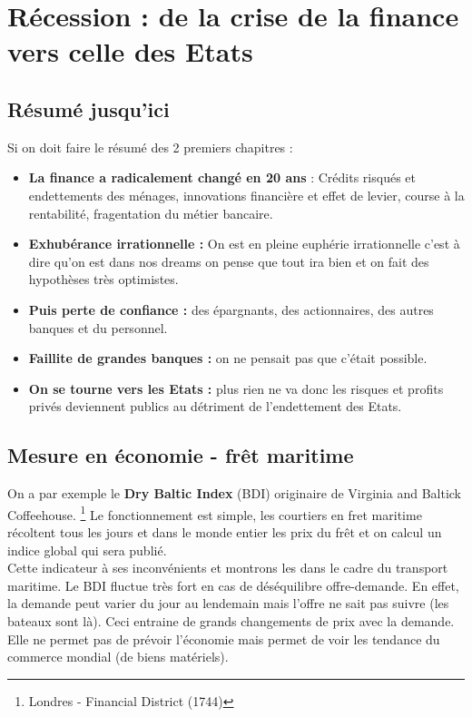 
\chapter{Récession : de la crise de la finance vers celle des Etats}
\section{Résumé jusqu'ici}
Si on doit faire le résumé des 2 premiers chapitres : 
\begin{itemize}
	\item \textbf{La finance a radicalement changé en 20 ans} : Crédits risqués et endettements des ménages, innovations financière et effet de levier, course à la rentabilité, fragentation du métier bancaire.
	      
	\item \textbf{Exhubérance irrationnelle :} On est en pleine euphérie irrationnelle c'est à dire qu'on est dans nos dreams on pense que tout ira bien et on fait des hypothèses très optimistes.
	      
	\item \textbf{Puis perte de confiance :} des épargnants, des actionnaires, des autres banques et du personnel. 
	      
	\item \textbf{Faillite de grandes banques :} on ne pensait pas que c'était possible. 
	      
	\item \textbf{On se tourne vers les Etats :} plus rien ne va donc les risques et profits privés deviennent publics au détriment de l'endettement des Etats.  
\end{itemize}

\section{Mesure en économie - frêt maritime}
On a par exemple le \textbf{Dry Baltic Index} (BDI) originaire de Virginia and Baltick Coffeehouse. \footnote{Londres - Financial District (1744)} Le fonctionnement est simple, les courtiers en fret maritime récoltent tous les jours et dans le monde entier les prix du frêt et on calcul un indice global qui sera publié.\\
Cette indicateur à ses inconvénients et montrons les dans le cadre du transport maritime. Le BDI fluctue très fort en cas de déséquilibre offre-demande. En effet, la demande peut varier du jour au lendemain mais l'offre ne sait pas suivre (les bateaux sont là). Ceci entraine de grands changements de prix avec la demande. Elle ne permet pas de prévoir l'économie mais permet de voir les tendance du commerce mondial (de biens matériels). 

